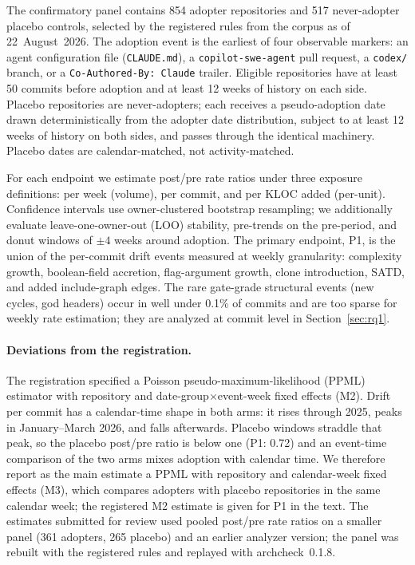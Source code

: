 \documentclass[sigplan,11pt,nonacm=true]{acmart}
\begin{document}
The confirmatory panel contains 854 adopter repositories and 517 never-adopter
placebo controls, selected by the registered rules from the corpus as of
22~August~2026. The adoption event is the earliest of four observable
markers: an agent configuration file (\texttt{CLAUDE.md}), a
\texttt{copilot-swe-agent} pull request, a \texttt{codex/} branch, or a
\texttt{Co-Authored-By: Claude} trailer. Eligible repositories have at least
50 commits before adoption and at least 12 weeks of history on each side.
Placebo repositories are never-adopters; each receives a pseudo-adoption date
drawn deterministically from the adopter date distribution, subject to at
least 12 weeks of history on both sides, and passes through the identical
machinery. Placebo dates are calendar-matched, not activity-matched.

For each endpoint we estimate post/pre rate ratios under three exposure
definitions: per week (volume), per commit, and per KLOC added (per-unit).
Confidence intervals use owner-clustered bootstrap resampling; we additionally
evaluate leave-one-owner-out (LOO) stability, pre-trends on the pre-period,
and donut windows of $\pm4$ weeks around adoption. The primary endpoint, P1,
is the union of the per-commit drift events measured at weekly granularity:
complexity growth, boolean-field accretion, flag-argument growth, clone
introduction, SATD, and added include-graph edges. The rare gate-grade
structural events (new cycles, god headers) occur in well under 0.1\% of
commits and are too sparse for weekly rate estimation; they are analyzed at
commit level in Section~\ref{sec:rq1}.

\paragraph{Deviations from the registration.} The registration specified a
Poisson pseudo-maximum-likelihood (PPML) estimator with repository and
date-group$\times$event-week fixed effects (M2). Drift per commit has a
calendar-time shape in both arms: it rises through 2025, peaks in
January--March 2026, and falls afterwards. Placebo windows straddle that peak,
so the placebo post/pre ratio is below one (P1: 0.72) and an event-time
comparison of the two arms mixes adoption with calendar time. We therefore
report as the main estimate a PPML with repository and calendar-week fixed
effects (M3), which compares adopters with placebo repositories in the same
calendar week; the registered M2 estimate is given for P1 in the text. The
estimates submitted for review used pooled post/pre rate ratios on a smaller
panel (361 adopters, 265 placebo) and an earlier analyzer version; the panel
was rebuilt with the registered rules and replayed with archcheck~0.1.8.
\end{document}
